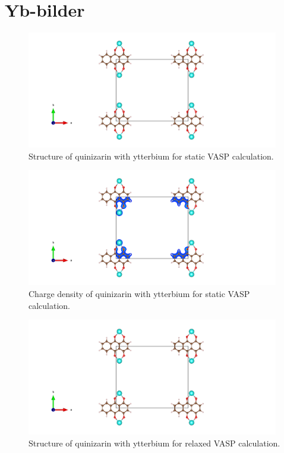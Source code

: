 \documentclass{article}
\begin{document}
\vspace{1cm}

\section{Yb-bilder}

  \begin{figure}[H]
      \centering
      \includegraphics[width = 11cm]{../fig/Yb_staticbefore_CONTCAR.png}
      \caption{Structure of quinizarin with ytterbium for static VASP calculation. }
      \label{fig:Yb_staticbefore_CONTCAR}
  \end{figure}

  \begin{figure}[H]
      \centering
      \includegraphics[width = 11cm]{../fig/Yb_staticbefore_CHGCAR.png}
      \caption{Charge density of quinizarin with ytterbium for static VASP calculation. }
      \label{fig:Yb_staticbefore_CHGCAR}
  \end{figure}

  \begin{figure}[H]
      \centering
      \includegraphics[width = 11cm]{../fig/Yb_relax_CONTCAR.png}
      \caption{Structure of quinizarin with ytterbium for relaxed VASP calculation. }
      \label{fig:Yb_relax_CONTCAR}
  \end{figure}
\end{document}
